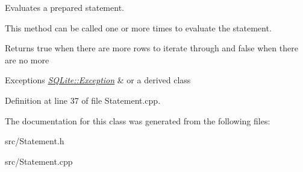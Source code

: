 Evaluates a prepared statement. 

This method can be called one or more times to evaluate the statement. \begin{DoxyReturn}{Returns}
true when there are more rows to iterate through and false when there are no more 
\end{DoxyReturn}

\begin{DoxyExceptions}{Exceptions}
{\em \hyperlink{a00003}{S\-Q\-Lite\-::\-Exception}} & or a derived class \\
\hline
\end{DoxyExceptions}


Definition at line 37 of file Statement.\-cpp.



The documentation for this class was generated from the following files\-:\begin{DoxyCompactItemize}
\item 
src/Statement.\-h\item 
src/Statement.\-cpp\end{DoxyCompactItemize}
